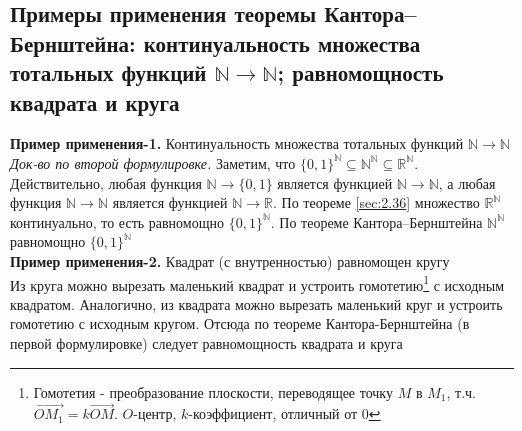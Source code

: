 \documentclass[a4paper]{article}
\begin{document}
\subsection{Примеры применения теоремы Кантора–Бернштейна: континуальность множества тотальных функций $\mathbb{N}\rightarrow\mathbb{N}$; равномощность квадрата и круга}
\textbf{Пример применения-1.} Континуальность множества тотальных функций $\mathbb{N}\rightarrow\mathbb{N}$\\[2mm]
\indent \textit{Док-во по второй формулировке.} Заметим, что $\{0,1\}^{\mathbb{N}}\subseteq\mathbb{N}^{\mathbb{N}}\subseteq\mathbb{R}^{\mathbb{N}}$. Действительно, любая функция $\mathbb{N}\rightarrow \{0,1\}$ является функцией $\mathbb{N}\rightarrow\mathbb{N}$, а любая функция $\mathbb{N}\rightarrow\mathbb{N}$ является функцией $\mathbb{N}\rightarrow\mathbb{R}$. По теореме \ref{sec:2.36} множество $\mathbb{R}^{\mathbb{N}}$ континуально, то есть равномощно $\{0,1\}^{\mathbb{N}}$. По теореме Кантора–Бернштейна $\mathbb{N}^{\mathbb{N}}$ равномощно $\{0, 1\}^{\mathbb{N}}$\\[2mm]
\textbf{Пример применения-2.} Квадрат (с внутренностью) равномощен кругу\\[2mm]
\indent Из круга можно вырезать маленький квадрат и устроить гомотетию\footnote{Гомотетия - преобразование плоскости, переводящее точку $M$ в $M_1$, т.ч. $\overrightarrow{OM_1}=k\overrightarrow{OM}$. $O$-центр, $k$-коэффициент, отличный от 0} с исходным квадратом. Аналогично, из квадрата можно вырезать маленький круг и устроить гомотетию с исходным кругом. Отсюда по теореме Кантора-Бернштейна (в первой формулировке) следует равномощность квадрата и круга
\end{document}
